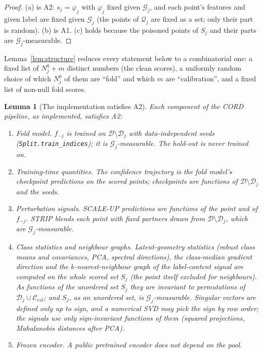 \documentclass[11pt]{article}
\newtheorem{lemma}{Lemma}
\theoremstyle{definition}
\theoremstyle{remark}
\newcommand{\Cal}{\mathcal{C}_{\mathrm{cal}}}
\newcommand{\D}{\mathcal{D}}
\newcommand{\G}{\mathcal{G}}
\newcommand{\Q}{\mathcal{Q}}
\newcommand{\1}{\mathbf{1}}
\begin{document}
\begin{proof}
(a) is A2: $s_j=\varphi_j$ with $\varphi_j$ fixed given $\G_j$, and each point's features and
given label are fixed given $\G_j$ (the points of $\Q_j$ are fixed as a set; only their part is
random). (b) is A1. (c) holds because the poisoned points of $S_j$ and their parts are
$\G_j$-measurable.
\end{proof}

Lemma~\ref{lem:structure} reduces every statement below to a combinatorial one: a fixed list of
$N_j^0+m$ distinct numbers (the clean scores), a uniformly random choice of which $N_j^0$ of them
are ``fold'' and which $m$ are ``calibration'', and a fixed list of non-null fold scores.

\begin{lemma}[The implementation satisfies A2]\label{lem:A2}
Each component of the CORD pipeline, as implemented, satisfies A2:
\begin{enumerate}[label=(\roman*),leftmargin=*]
\item \emph{Fold model.} $f_{-j}$ is trained on $\D\setminus\D_j$ with data-independent seeds
  (\texttt{Split.train\_indices}); it is $\G_j$-measurable. The hold-out is never trained on.
\item \emph{Training-time quantities.} The confidence trajectory is the fold model's checkpoint
  predictions on the scored points; checkpoints are functions of $\D\setminus\D_j$ and the seeds.
\item \emph{Perturbation signals.} SCALE-UP predictions are functions of the point and of
  $f_{-j}$. STRIP blends each point with fixed partners drawn from $\D\setminus\D_j$, which
  are $\G_j$-measurable.
\item \emph{Class statistics and neighbour graphs.} Latent-geometry statistics (robust class means
  and covariances, PCA, spectral directions), the class-median gradient direction and the
  $k$-nearest-neighbour graph of the label-content signal are computed on the whole scored set
  $S_j$ (the point itself excluded for neighbours). As functions of the \emph{unordered} set $S_j$
  they are invariant to permutations of $\D_j\cup\Cal$; and $S_j$, as an unordered set, is
  $\G_j$-measurable. Singular vectors are defined only up to sign, and a numerical SVD may pick
  the sign by row order; the signals use only sign-invariant functions of them (squared
  projections, Mahalanobis distances after PCA).
\item \emph{Frozen encoder.} A public pretrained encoder does not depend on the pool.

\end{enumerate}
\end{lemma}
\end{document}
